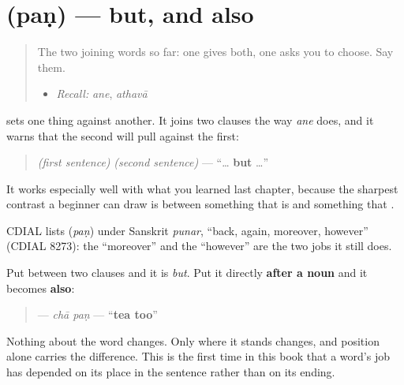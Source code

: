 \section[\texorpdfstring{\gu{પણ} (paṇ)}{પણ (paṇ)}]{ (paṇ) — but, and also}

\label{lesson:GU-C32-pan}



\begin{quote}
The two joining words so far: one gives both, one asks you to choose. Say them.

\begin{itemize}
\raggedright
  \item \emph{Recall:} \emph{ane}, \emph{athavā}
\end{itemize}
\end{quote}

\begin{cousinweb}
\textbf{} sets one thing against another. It joins two clauses the way \emph{ane} does, and it warns that the second will pull against the first:

\begin{quote}
\emph{(first sentence)} \textbf{} \emph{(second sentence)} — \textquotedblleft{}… \textbf{but} …\textquotedblright{}
\end{quote}

It works especially well with what you learned last chapter, because the sharpest contrast a beginner can draw is between something that is and something that \textbf{}.

CDIAL lists \textbf{} (\emph{paṇ}) under Sanskrit \emph{punar}, \textquotedblleft{}back, again, moreover, however\textquotedblright{} (CDIAL 8273): the \textquotedblleft{}moreover\textquotedblright{} and the \textquotedblleft{}however\textquotedblright{} are the two jobs it still does.
\end{cousinweb}

\begin{grammarlens}[title={Grammar Lens: the same word, moved, means \textquotedblleft{}also\textquotedblright{}}]
Put \textbf{} between two clauses and it is \emph{but}. Put it directly \textbf{after a noun} and it becomes \textbf{also}:

\begin{quote}
\textbf{ } — \emph{chā paṇ} — \textquotedblleft{}\textbf{tea too}\textquotedblright{}
\end{quote}

Nothing about the word changes. Only where it stands changes, and position alone carries the difference. This is the first time in this book that a word's job has depended on its place in the sentence rather than on its ending.
\end{grammarlens}

